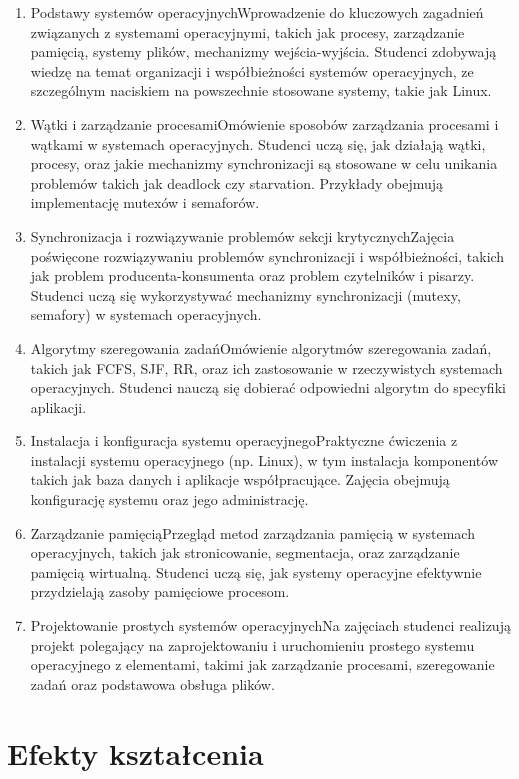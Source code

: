 \documentclass[12pt, a4paper]{article}
\begin{document}
\begin{enumerate}
  \item Podstawy systemów operacyjnychWprowadzenie do kluczowych zagadnień związanych z systemami operacyjnymi, takich jak procesy, zarządzanie pamięcią, systemy plików, mechanizmy wejścia-wyjścia. Studenci zdobywają wiedzę na temat organizacji i współbieżności systemów operacyjnych, ze szczególnym naciskiem na powszechnie stosowane systemy, takie jak Linux.
  \item Wątki i zarządzanie procesamiOmówienie sposobów zarządzania procesami i wątkami w systemach operacyjnych. Studenci uczą się, jak działają wątki, procesy, oraz jakie mechanizmy synchronizacji są stosowane w celu unikania problemów takich jak deadlock czy starvation. Przykłady obejmują implementację mutexów i semaforów.
  \item Synchronizacja i rozwiązywanie problemów sekcji krytycznychZajęcia poświęcone rozwiązywaniu problemów synchronizacji i współbieżności, takich jak problem producenta-konsumenta oraz problem czytelników i pisarzy. Studenci uczą się wykorzystywać mechanizmy synchronizacji (mutexy, semafory) w systemach operacyjnych.
  \item Algorytmy szeregowania zadańOmówienie algorytmów szeregowania zadań, takich jak FCFS, SJF, RR, oraz ich zastosowanie w rzeczywistych systemach operacyjnych. Studenci nauczą się dobierać odpowiedni algorytm do specyfiki aplikacji.
  \item Instalacja i konfiguracja systemu operacyjnegoPraktyczne ćwiczenia z instalacji systemu operacyjnego (np. Linux), w tym instalacja komponentów takich jak baza danych i aplikacje współpracujące. Zajęcia obejmują konfigurację systemu oraz jego administrację.
  \item Zarządzanie pamięciąPrzegląd metod zarządzania pamięcią w systemach operacyjnych, takich jak stronicowanie, segmentacja, oraz zarządzanie pamięcią wirtualną. Studenci uczą się, jak systemy operacyjne efektywnie przydzielają zasoby pamięciowe procesom.
  \item Projektowanie prostych systemów operacyjnychNa zajęciach studenci realizują projekt polegający na zaprojektowaniu i uruchomieniu prostego systemu operacyjnego z elementami, takimi jak zarządzanie procesami, szeregowanie zadań oraz podstawowa obsługa plików.
\end{enumerate}

\section{Efekty kształcenia}
\end{document}
